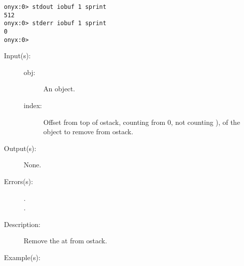 \begin{description}
\begin{description}
\begin{verbatim}
onyx:0> stdout iobuf 1 sprint
512
onyx:0> stderr iobuf 1 sprint
0
onyx:0>
		\end{verbatim}
	\end{description}
\label{systemdict:ipop}
\item[{\onyxop{obj \dots index}{ipop}{\dots}}: ]
	\begin{description}\item[]
	\item[Input(s): ]
		\begin{description}\item[]
		\item[obj: ]
			An object.
		\item[index: ]
			Offset from top of ostack, counting from 0, not counting
			), of the object to remove from ostack.
		\end{description}
	\item[Output(s): ] None.
	\item[Errors(s): ]
		\begin{description}\item[]
		\item[.]
		\item[.]
		\end{description}
	\item[Description: ]
		Remove the  at  from ostack.
	\item[Example(s): ]\begin{verbatim}


\end{verbatim}
\end{description}
\end{description}
